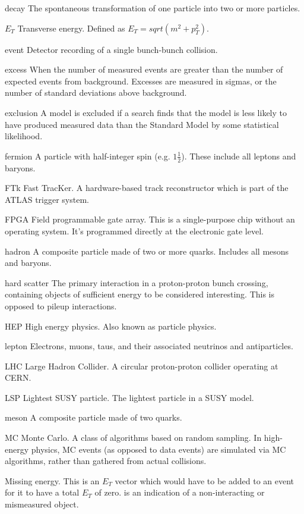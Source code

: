 \begin{symbollist*}
\item[decay] The spontaneous transformation of one particle into two or more particles.
\item[$E_T$] Transverse energy. Defined as $E_T = sqrt(m^2 + p_T^2)$.
\item[event] Detector recording of a single bunch-bunch collision.
\item[excess] When the number of measured events are greater than the number of expected events from background. Excesses are measured in sigmas, or the number of standard deviations above background.
\item[exclusion] A model is excluded if a search finds that the model is less likely to have produced measured data than the Standard Model by some statistical likelihood.
\item[fermion] A particle with half-integer spin (e.g. $1\frac{1}{2}$). These include all leptons and baryons.
\item[FTk] Fast TracKer. A hardware-based track reconstructor which is part of the ATLAS trigger system.
\item[FPGA] Field programmable gate array. This is a single-purpose chip without an operating system. It's programmed directly at the electronic gate level.
\item[hadron] A composite particle made of two or more quarks. Includes all mesons and baryons.
\item[hard scatter] The primary interaction in a proton-proton bunch crossing, containing objects of sufficient energy to be considered interesting. This is opposed to pileup interactions.
\item[HEP] High energy physics. Also known as particle physics.
\item[lepton] Electrons, muons, taus, and their associated neutrinos and antiparticles.
\item[LHC] Large Hadron Collider. A circular proton-proton collider operating at CERN.
\item[LSP] Lightest SUSY particle. The lightest particle in a SUSY model.
\item[meson] A composite particle made of two quarks.
\item[MC] Monte Carlo. A class of algorithms based on random sampling. In high-energy physics, MC events (as opposed to data events) are simulated via MC algorithms, rather than gathered from actual collisions.
\item[\MET] Missing energy. This is an $E_T$ vector which would have to be added to an event for it to have a total $E_T$ of zero. \MET is an indication of a non-interacting or mismeasured object.

\end{symbollist*}
